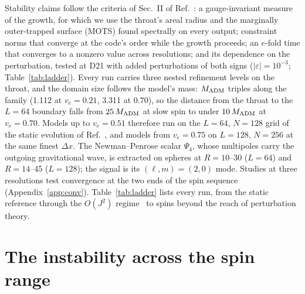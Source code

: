 \documentclass[twocolumn,floatfix,aps,prd,superscriptaddress,nofootinbib]{revtex4-2}
\begin{document}
Stability claims follow the criteria of Sec.~II of Ref.~\cite{evstafyeva2025}: a gauge-invariant measure of the growth, for which we use the throat's areal radius and the marginally outer-trapped surface (MOTS) found spectrally on every output; constraint norms that converge at the code's order while the growth proceeds; an $e$-fold time that converges to a nonzero value across resolutions; and its dependence on the perturbation, tested at D21 with added perturbations of both signs ($|\varepsilon|=10^{-3}$; Table~\ref{tab:ladder}). Every run carries three nested refinement levels on the throat, and the domain size follows the model's mass: $M_{\rm ADM}$ triples along the family (1.112 at $v_e=0.21$, 3.311 at $0.70$), so the distance from the throat to the $L=64$ boundary falls from $25\,M_{\rm ADM}$ at slow spin to under $10\,M_{\rm ADM}$ at $v_e=0.70$. Models up to $v_e=0.51$ therefore run on the $L=64$, $N=128$ grid of the static evolution of Ref.~\cite{shirokov2026c}, and models from $v_e=0.75$ on $L=128$, $N=256$ at the same finest $\Delta x$. The Newman--Penrose scalar $\Psi_4$, whose multipoles carry the outgoing gravitational wave, is extracted on spheres at $R=10$--30 ($L=64$) and $R=14$--45 ($L=128$); the signal is its $(\ell,m)=(2,0)$ mode. Studies at three resolutions test convergence at the two ends of the spin sequence (Appendix~\ref{app:conv}). Table~\ref{tab:ladder} lists every run, from the static reference through the $O(J^2)$ regime~\cite{azad2023,azad2024} to spins beyond the reach of perturbation theory.

\section{The instability across the spin range}
\label{sec:slow}
\end{document}
